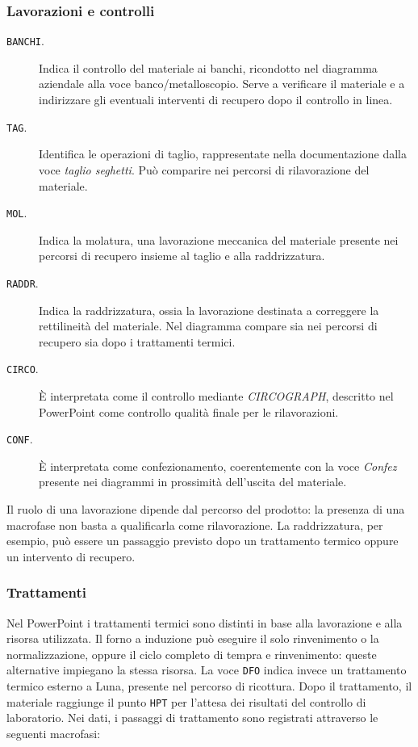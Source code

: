 \subsubsection{Lavorazioni e controlli}

\begin{description}
\item[\texttt{BANCHI}.] Indica il controllo del materiale ai banchi, ricondotto nel diagramma aziendale alla voce banco/metalloscopio. Serve a verificare il materiale e a indirizzare gli eventuali interventi di recupero dopo il controllo in linea.

\item[\texttt{TAG}.] Identifica le operazioni di taglio, rappresentate nella documentazione dalla voce \emph{taglio seghetti}. Può comparire nei percorsi di rilavorazione del materiale.

\item[\texttt{MOL}.] Indica la molatura, una lavorazione meccanica del materiale presente nei percorsi di recupero insieme al taglio e alla raddrizzatura.

\item[\texttt{RADDR}.] Indica la raddrizzatura, ossia la lavorazione destinata a correggere la rettilineità del materiale. Nel diagramma compare sia nei percorsi di recupero sia dopo i trattamenti termici.

\item[\texttt{CIRCO}.] È interpretata come il controllo mediante \emph{CIRCOGRAPH}, descritto nel PowerPoint come controllo qualità finale per le rilavorazioni.

\item[\texttt{CONF}.] È interpretata come confezionamento, coerentemente con la voce \emph{Confez} presente nei diagrammi in prossimità dell'uscita del materiale.
\end{description}

Il ruolo di una lavorazione dipende dal percorso del prodotto: la presenza di una macrofase non basta a qualificarla come rilavorazione. La raddrizzatura, per esempio, può essere un passaggio previsto dopo un trattamento termico oppure un intervento di recupero.

\subsubsection{Trattamenti}

Nel PowerPoint i trattamenti termici sono distinti in base alla lavorazione e alla risorsa utilizzata. Il forno a induzione può eseguire il solo rinvenimento o la normalizzazione, oppure il ciclo completo di tempra e rinvenimento: queste alternative impiegano la stessa risorsa. La voce \texttt{DFO} indica invece un trattamento termico esterno a Luna, presente nel percorso di ricottura. Dopo il trattamento, il materiale raggiunge il punto \texttt{HPT} per l'attesa dei risultati del controllo di laboratorio. Nei dati, i passaggi di trattamento sono registrati attraverso le seguenti macrofasi:

